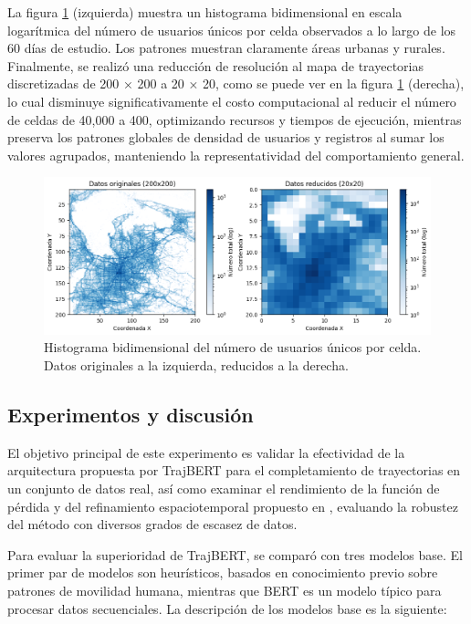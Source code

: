 La figura \ref{fig:unique_user_per_cell_2_dimensional_histogram} (izquierda) muestra un histograma bidimensional en escala logarítmica del número de usuarios únicos por celda observados a lo largo de los 60 días de estudio. Los patrones muestran claramente áreas urbanas y rurales. Finalmente, se realizó una reducción de resolución al mapa de trayectorias discretizadas de 200 × 200 a 20 × 20, como se puede ver en la figura \ref{fig:unique_user_per_cell_2_dimensional_histogram} (derecha), lo cual disminuye significativamente el costo computacional al reducir el número de celdas de 40,000 a 400, optimizando recursos y tiempos de ejecución, mientras preserva los patrones globales de densidad de usuarios y registros al sumar los valores agrupados, manteniendo la representatividad del comportamiento general.

\begin{figure}[!htb] \centering \includegraphics[width=1\textwidth]{Graphics/unique_user_per_cell_2_dimensional_histogram.png} \caption{Histograma bidimensional del número de usuarios únicos por celda. Datos originales a la izquierda, reducidos a la derecha.} \label{fig:unique_user_per_cell_2_dimensional_histogram} 
\end{figure}

\subsection{Experimentos y discusión} 
\label{sec:humob_experiments}

El objetivo principal de este experimento es validar la efectividad de la arquitectura propuesta por TrajBERT para el completamiento de trayectorias en un conjunto de datos real, así como examinar el rendimiento de la función de pérdida y del refinamiento espaciotemporal propuesto en \cite{si2023trajbert}, evaluando la robustez del método con diversos grados de escasez de datos.

Para evaluar la superioridad de TrajBERT, se comparó con tres modelos base. El primer par de modelos son heurísticos, basados en conocimiento previo sobre patrones de movilidad humana, mientras que BERT es un modelo típico para procesar datos secuenciales. La descripción de los modelos base es la siguiente:

